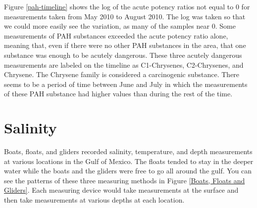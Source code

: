 \documentclass[11pt]{article}
\begin{document}
Figure \ref {pah-timeline} shows the log of the acute potency ratios not equal to 0 for measurements taken from May 2010 to August 2010. The log was taken so that we could more easily see the variation, as many of the samples near 0. Some measurements of PAH substances exceeded the acute potency ratio alone, meaning that, even if there were no other PAH substances in the area, that one substance was enough to be acutely dangerous. These three acutely dangerous measurements are labeled on the timeline as C1-Chrysenes, C2-Chrysenes, and Chrysene. The Chrysene family is considered a carcinogenic substance. There seems to be a period of time between June and July in which the measurements of these PAH substance had higher values than during the rest of the time.

\section{Salinity}
Boats, floats, and gliders recorded salinity, temperature, and depth measurements at various locations in the Gulf of Mexico. The floats tended to stay in the deeper water while the boats and the gliders were free to go all around the gulf.  You can see the patterns of these three measuring methods in Figure \ref {Boats, Floats and Gliders}. Each measuring device would take measurements at the surface and then take measurements at various depths at each location.  
\end{document}
